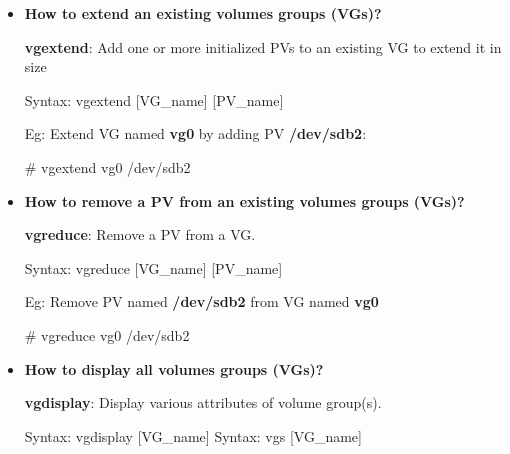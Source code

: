 \begin{flushleft}
	\bigskip
		\begin{itemize}
		
		\item 	\textbf{How to extend an existing volumes groups (VGs)?}
		
		\textbf{vgextend}: Add one or more initialized PVs to an existing VG to extend it in size
		\begin{tcolorbox}[breakable,notitle,boxrule=-0pt,colback=pink,colframe=pink]
			\color{black}
			\font=9pt
			Syntax: vgextend [VG\_name] [PV\_name]
			\font=4pt
		\end{tcolorbox}
		
		Eg: Extend VG named \textbf{vg0} by adding PV \textbf{/dev/sdb2}:
		\begin{tcolorbox}[breakable,notitle,boxrule=-0pt,colback=black,colframe=black]
			\color{green}
			\font=9pt
			\# vgextend vg0  /dev/sdb2
			\font=4pt
		\end{tcolorbox}
		
		\bigskip
		\bigskip


		\item 	\textbf{How to remove a PV from an existing volumes groups (VGs)?}

		\textbf{vgreduce}: Remove a PV from a VG.
		\begin{tcolorbox}[breakable,notitle,boxrule=-0pt,colback=pink,colframe=pink]
			\color{black}
			\font=9pt
			Syntax: vgreduce [VG\_name] [PV\_name]
			\font=4pt
		\end{tcolorbox}
		
		Eg: Remove PV named \textbf{/dev/sdb2} from VG named \textbf{vg0}
		\begin{tcolorbox}[breakable,notitle,boxrule=-0pt,colback=black,colframe=black]
			\color{green}
			\font=9pt
			\# vgreduce vg0  /dev/sdb2
			\font=4pt
		\end{tcolorbox}
		
		\newpage	
		\item 	\textbf{How to display all volumes groups (VGs)?}
		
		\textbf{vgdisplay}: Display various attributes of volume group(s).
		\begin{tcolorbox}[breakable,notitle,boxrule=-0pt,colback=pink,colframe=pink]
			\color{black}
			\font=9pt
			Syntax: vgdisplay [VG\_name]
			\newline
			Syntax: vgs [VG\_name]
			\font=4pt
		\end{tcolorbox}
		 	

\end{itemize}
\end{flushleft}
